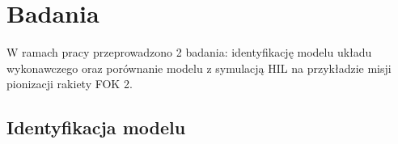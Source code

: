 \section{Badania}
\label{sec:badania}
W ramach pracy przeprowadzono 2 badania:
identyfikację modelu układu wykonawczego oraz porównanie modelu z symulacją HIL na przykładzie misji pionizacji rakiety FOK 2.
\subsection{Identyfikacja modelu}
\label{subsec:badania-identyfikacja}





